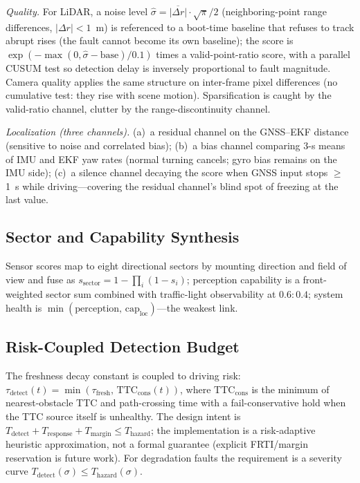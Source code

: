 \documentclass[letterpaper, 10pt, conference]{ieeeconf}
\begin{document}
\emph{Quality.} For LiDAR, a noise level
$\hat{\sigma}=\overline{|\Delta r|}\cdot\sqrt{\pi}/2$ (neighboring-point
range differences, $|\Delta r|<1$~m) is referenced to a boot-time baseline
that refuses to track abrupt rises (the fault cannot become its own
baseline); the score is $\exp(-\max(0,\hat{\sigma}-\mathrm{base})/0.1)$
times a valid-point-ratio score, with a parallel CUSUM test so detection
delay is inversely proportional to fault magnitude. Camera quality applies
the same structure on inter-frame pixel differences (no cumulative test:
they rise with scene motion). Sparsification is caught by the valid-ratio
channel, clutter by the range-discontinuity channel.

\emph{Localization (three channels).} (a)~a residual channel on the
GNSS--EKF distance (sensitive to noise and correlated bias); (b)~a bias
channel comparing 3-s means of IMU and EKF yaw rates (normal turning
cancels; gyro bias remains on the IMU side); (c)~a silence channel decaying
the score when GNSS input stops $\ge$1~s while driving---covering the
residual channel's blind spot of freezing at the last value.

\subsection{Sector and Capability Synthesis}
Sensor scores map to eight directional sectors by mounting direction and
field of view and fuse as $s_{\mathrm{sector}}=1-\prod_i(1-s_i)$;
perception capability is a front-weighted sector sum combined with
traffic-light observability at $0.6{:}0.4$; system health is
$\min(\mathrm{perception},\,\mathrm{cap_{loc}})$---the weakest link.

\subsection{Risk-Coupled Detection Budget}
The freshness decay constant is coupled to driving risk:
$\tau_{\mathrm{detect}}(t)=\min(\tau_{\mathrm{fresh}},\,
\mathrm{TTC}_{\mathrm{cons}}(t))$, where
$\mathrm{TTC}_{\mathrm{cons}}$ is the minimum of nearest-obstacle TTC and
path-crossing time with a fail-conservative hold when the TTC source itself
is unhealthy. The design intent is
$T_{\mathrm{detect}}+T_{\mathrm{response}}+T_{\mathrm{margin}}\le
T_{\mathrm{hazard}}$; the implementation is a risk-adaptive heuristic
approximation, not a formal guarantee (explicit FRTI/margin reservation is
future work). For degradation faults the requirement is a severity curve
$T_{\mathrm{detect}}(\sigma)\le T_{\mathrm{hazard}}(\sigma)$.
\end{document}
